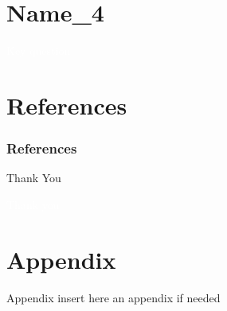 \documentclass{beamer}
\begin{document}
\section{Name\_4}
\begingroup
{
\begin{frame}[c]
\vfill
\begin{center}
\Large\textcolor{white}{Key question}
\end{center}
\vfill
\end{frame}
}
\endgroup


\section{References}
\begin{frame}[allowframebreaks]
\frametitle{References}\scriptsize



\end{frame}

\begin{frame}
\Huge{\centerline{Thank You}}
\end{frame}

\begingroup
{
\begin{frame}[c]
\vfill
\begin{center}
\Large\textcolor{white}{Thank you}
\end{center}
\vfill
\end{frame}
} 

\endgroup


\section{Appendix}
\begin{frame}{Appendix}
    insert here an appendix if needed
\end{frame}
\end{document}
